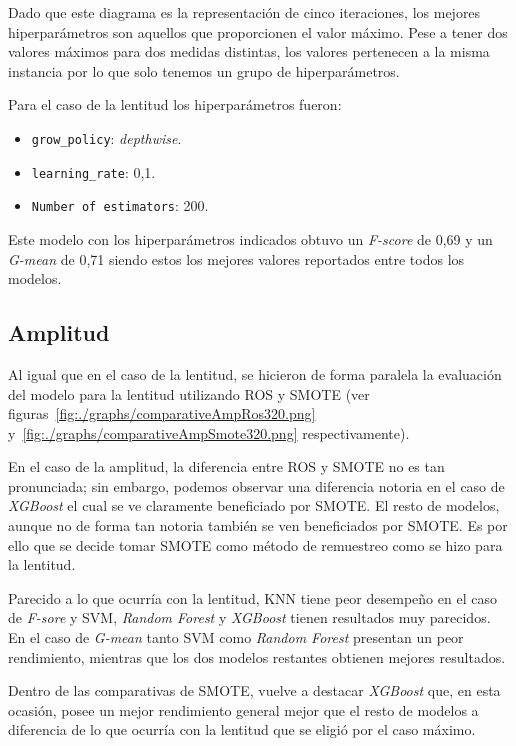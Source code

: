 Dado que este diagrama es la representación de cinco iteraciones, los mejores hiperparámetros son aquellos que proporcionen el valor máximo. Pese a tener dos valores máximos para dos medidas distintas, los valores pertenecen a la misma instancia por lo que solo tenemos un grupo de hiperparámetros.

Para el caso de la lentitud los hiperparámetros fueron:
\begin{itemize}
\item \texttt{grow\_policy}: \textit{depthwise}.
\item \texttt{learning\_rate}: 0,1.
\item \texttt{Number of estimators}: 200.
\end{itemize}
Este modelo con los hiperparámetros indicados obtuvo un \textit{F-score} de 0,69 y un \textit{G-mean} de 0,71 siendo estos los mejores valores reportados entre todos los modelos.

\subsection{Amplitud}

Al igual que en el caso de la lentitud,  se hicieron de forma paralela la evaluación del modelo para la lentitud utilizando ROS y SMOTE (ver figuras~\ref{fig:./graphs/comparativeAmpRos320.png} y~\ref{fig:./graphs/comparativeAmpSmote320.png} respectivamente).

En el caso de la amplitud, la diferencia entre ROS y SMOTE no es tan pronunciada; sin embargo, podemos observar una diferencia notoria en el caso de \textit{XGBoost} el cual se ve claramente beneficiado por SMOTE. El resto de modelos, aunque no de forma tan notoria también se ven beneficiados por SMOTE. Es por ello que se decide tomar SMOTE como método de remuestreo como se hizo para la lentitud. 

Parecido a lo que ocurría con la lentitud, KNN tiene peor desempeño en el caso de \textit{F-sore} y SVM, \textit{Random Forest} y \textit{XGBoost} tienen resultados muy parecidos. En el caso de \textit{G-mean} tanto SVM como \textit{Random Forest} presentan un peor rendimiento, mientras que los dos modelos restantes obtienen mejores resultados.

Dentro de las comparativas de SMOTE, vuelve a destacar \textit{XGBoost} que, en esta ocasión, posee un mejor rendimiento general mejor que el resto de modelos a diferencia de lo que ocurría con la lentitud que se eligió por el caso máximo. 

